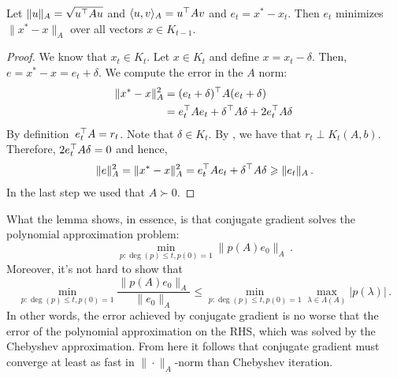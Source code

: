\begin{lemma}
Let $\|u\|_A = \sqrt{u^\top A u}$ and $\langle u,v\rangle_A = u^\top A v$ and 
$e_t = x^* - x_t$. Then $e_t$ minimizes $\|x^* - x\|_A$ over all vectors $x \in K_{t-1}$.
\end{lemma}

\begin{proof}
We know that $x_t \in K_t$. Let $x \in K_t$ and define $x = x_t - \delta$. 
Then, $e = x^* - x = e_t + \delta.$
We compute the error in the $A$ norm:
\begin{align*}
\|x^* - x\|_A^2 
&= (e_t + \delta)^{\top} A(e_t + \delta) \\
&= e_t^{\top}Ae_t + \delta^{\top}A\delta + 2e_t^{\top} A \delta\,
\end{align*}
By definition~$e_t^{\top}A = r_t$.
Note that $\delta \in K_t.$ 
By , we have that $r_t \perp K_t(A,b).$
Therefore, $2e_t^{\top} A \delta = 0$ and hence, 
\begin{align*}
\|e\|_A^2
= \|x^* - x\|_A^2 
= e_t^{\top}Ae_t + \delta^{\top}A\delta
\geqslant \|e_t\|_A\,.
\end{align*}
In the last step we used that $A\succ0.$
\end{proof}

What the lemma shows, in essence, is that conjugate gradient solves the
polynomial approximation problem:
\[
\min_{p\colon\deg(p)\le t, p(0)=1} \|p(A)e_0\|_A\,.
\]
Moreover, it's not hard to show that
\[
\min_{p\colon\deg(p)\le t, p(0)=1} 
\frac{\|p(A)e_0\|_A}{\|e_0\|_A}
\le 
\min_{p\colon\deg(p)\le t, p(0)=1} 
\max_{\lambda\in\Lambda(A)}\left| p(\lambda)\right|\,.
\]
In other words, the error achieved by conjugate gradient is no worse that the
error of the polynomial approximation on the RHS, which was solved by the
Chebyshev approximation. From here it follows that conjugate gradient must
converge at least as fast in $\|\cdot\|_A$-norm than Chebyshev iteration.


